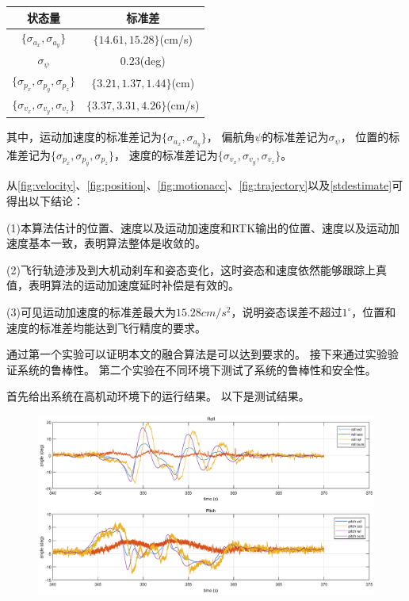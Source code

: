 \documentclass[
  type=master
]{gdutthesis}
\begin{document}
\begin{table}[h]
	\label{stdestimate}
	\begin{tabular}{cc}
		\toprule
		状态量 & 标准差 \\
		\midrule
		$\big\{ \sigma_{a_x},\sigma_{a_y} \big\}$ & $\big\{ 14.61, 15.28 \big\}$(cm/s) \\
		$\sigma_{\psi}$ & $0.23$(deg)   \\
		$\big\{ \sigma_{p_x},\sigma_{p_y},\sigma_{p_z} \big\}$ & $\big\{ 3.21, 1.37, 1.44 \big\}$(cm)   \\
		$\big\{ \sigma_{v_x},\sigma_{v_y},\sigma_{v_z} \big\}$ & $\big\{ 3.37, 3.31, 4.26 \big\}$(cm/s)   \\
		\bottomrule
	\end{tabular}
\end{table}

其中，运动加速度的标准差记为$\big\{ \sigma_{a_x},\sigma_{a_y} \big\}$，
偏航角$\psi$的标准差记为$\sigma_{\psi}$，
位置的标准差记为$\big\{ \sigma_{p_x},\sigma_{p_y},\sigma_{p_z} \big\}$，
速度的标准差记为$\big\{ \sigma_{v_x},\sigma_{v_y},\sigma_{v_z} \big\}$。

从\autoref{fig:velocity}、\autoref{fig:position}、\autoref{fig:motionacc}、\autoref{fig:trajectory}以及\autoref{stdestimate}可得出以下结论：

(1)本算法估计的位置、速度以及运动加速度和RTK输出的位置、速度以及运动加速度基本一致，表明算法整体是收敛的。

(2)飞行轨迹涉及到大机动刹车和姿态变化，这时姿态和速度依然能够跟踪上真值，表明算法的运动加速度延时补偿是有效的。

(3)可见运动加速度的标准差最大为$15.28cm/s^2$，说明姿态误差不超过$1^{\circ}$，位置和速度的标准差均能达到飞行精度的要求。

通过第一个实验可以证明本文的融合算法是可以达到要求的。
接下来通过实验验证系统的鲁棒性。
第二个实验在不同环境下测试了系统的鲁棒性和安全性。

首先给出系统在高机动环境下的运行结果。
以下是测试结果。
\begin{figure}[H]
	\centering
	\includegraphics[width=1.0\textwidth]{motionaccdelay.eps}
	\label{fig:motionaccdelay}
\end{figure}
\end{document}
